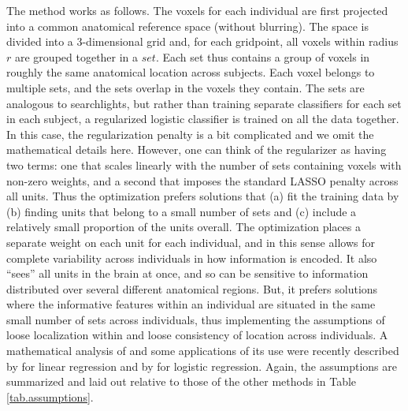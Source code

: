 The method works as follows. The voxels for each individual are first projected into a common anatomical reference space (without blurring). The space is divided into a 3-dimensional grid and, for each gridpoint, all voxels within radius $r$ are grouped together in a $set$. Each set thus contains a group of voxels in roughly the same anatomical location across subjects. Each voxel belongs to multiple sets, and the sets overlap in the voxels they contain. The sets are analogous to searchlights, but rather than training separate classifiers for each set in each subject, a regularized logistic classifier is trained on all the data together. In this case, the regularization penalty is a bit complicated and we omit the mathematical details here. However, one can think of the regularizer as having two terms: one that scales linearly with the number of sets containing voxels with non-zero weights, and a second that imposes the standard LASSO penalty across all units. Thus the optimization prefers solutions that (a) fit the training data by (b) finding units that belong to a small number of sets and (c) include a relatively small proportion of the units overall. The optimization places a separate weight on each unit for each individual, and in this sense allows for complete variability across individuals in how information is encoded. It also ``sees'' all units in the brain at once, and so can be sensitive to information distributed over several different anatomical regions. But, it prefers solutions where the informative features within an individual are situated in the same small number of sets across individuals, thus implementing the assumptions of loose localization within and loose consistency of location across individuals. A mathematical analysis of \soslasso and some applications of its use were recently described by \cite{raoNIPS} for linear regression and by \cite{raoML} for logistic regression. Again, the assumptions are summarized and laid out relative to those of the other methods in Table \ref{tab.assumptions}.

